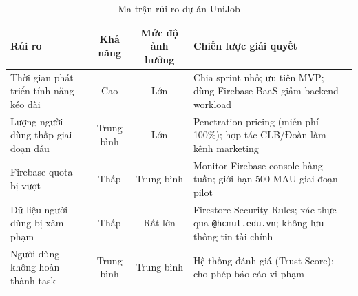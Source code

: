 \begin{table}[H]
\centering
\caption{Ma trận rủi ro dự án UniJob}
\renewcommand{\arraystretch}{1.5}
\begin{tabularx}{\textwidth}{|X|c|c|X|}
\hline
\textbf{Rủi ro} & \textbf{Khả năng} & \textbf{Mức độ ảnh hưởng} & \textbf{Chiến lược giải quyết} \\
\hline
Thời gian phát triển tính năng kéo dài & Cao & Lớn & Chia sprint nhỏ; ưu tiên MVP; dùng Firebase BaaS giảm backend workload \\
\hline
Lượng người dùng thấp giai đoạn đầu & Trung bình & Lớn & Penetration pricing (miễn phí 100\%); hợp tác CLB/Đoàn làm kênh marketing \\
\hline
Firebase quota bị vượt & Thấp & Trung bình & Monitor Firebase console hàng tuần; giới hạn 500 MAU giai đoạn pilot \\
\hline
Dữ liệu người dùng bị xâm phạm & Thấp & Rất lớn & Firestore Security Rules; xác thực qua \texttt{@hcmut.edu.vn}; không lưu thông tin tài chính \\
\hline
Người dùng không hoàn thành task & Trung bình & Trung bình & Hệ thống đánh giá (Trust Score); cho phép báo cáo vi phạm \\
\hline
\end{tabularx}
\end{table}
